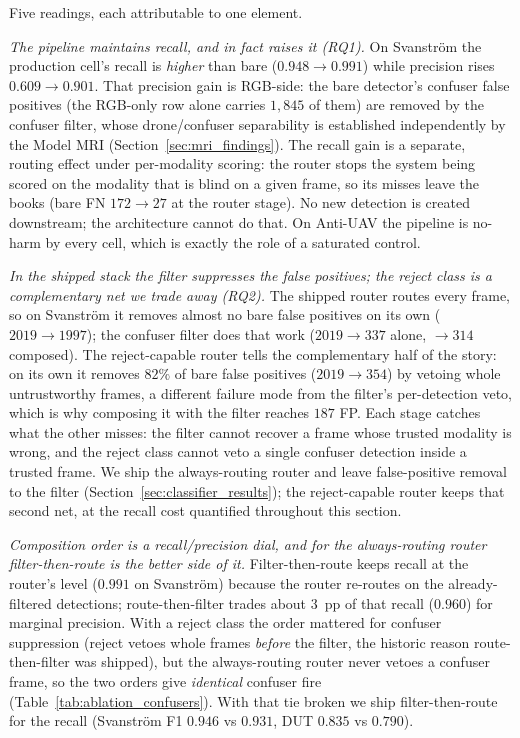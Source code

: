 Five readings, each attributable to one element.

\emph{The pipeline maintains recall, and in fact raises it (RQ1).} On Svanstr\"om the production cell's recall is \emph{higher} than bare ($0.948 \to 0.991$) while precision rises $0.609 \to 0.901$. That precision gain is RGB-side: the bare detector's confuser false positives (the RGB-only row alone carries $1{,}845$ of them) are removed by the confuser filter, whose drone/confuser separability is established independently by the Model MRI (Section~\ref{sec:mri_findings}). The recall gain is a separate, routing effect under per-modality scoring: the router stops the system being scored on the modality that is blind on a given frame, so its misses leave the books (bare FN $172 \to 27$ at the router stage). No new detection is created downstream; the architecture cannot do that. On Anti-UAV the pipeline is no-harm by every cell, which is exactly the role of a saturated control.

\emph{In the shipped stack the filter suppresses the false positives; the reject class is a complementary net we trade away (RQ2).} The shipped router routes every frame, so on Svanstr\"om it removes almost no bare false positives on its own ($2019 \to 1997$); the confuser filter does that work ($2019 \to 337$ alone, $\to 314$ composed). The reject-capable router tells the complementary half of the story: on its own it removes $82\%$ of bare false positives ($2019 \to 354$) by vetoing whole untrustworthy frames, a different failure mode from the filter's per-detection veto, which is why composing it with the filter reaches $187$ FP. Each stage catches what the other misses: the filter cannot recover a frame whose trusted modality is wrong, and the reject class cannot veto a single confuser detection inside a trusted frame. We ship the always-routing router and leave false-positive removal to the filter (Section~\ref{sec:classifier_results}); the reject-capable router keeps that second net, at the recall cost quantified throughout this section.

\emph{Composition order is a recall/precision dial, and for the always-routing router filter-then-route is the better side of it.} Filter-then-route keeps recall at the router's level ($0.991$ on Svanstr\"om) because the router re-routes on the already-filtered detections; route-then-filter trades about $3$~pp of that recall ($0.960$) for marginal precision. With a reject class the order mattered for confuser suppression (reject vetoes whole frames \emph{before} the filter, the historic reason route-then-filter was shipped), but the always-routing router never vetoes a confuser frame, so the two orders give \emph{identical} confuser fire (Table~\ref{tab:ablation_confusers}). With that tie broken we ship filter-then-route for the recall (Svanstr\"om F1 $0.946$ vs $0.931$, DUT $0.835$ vs $0.790$).

